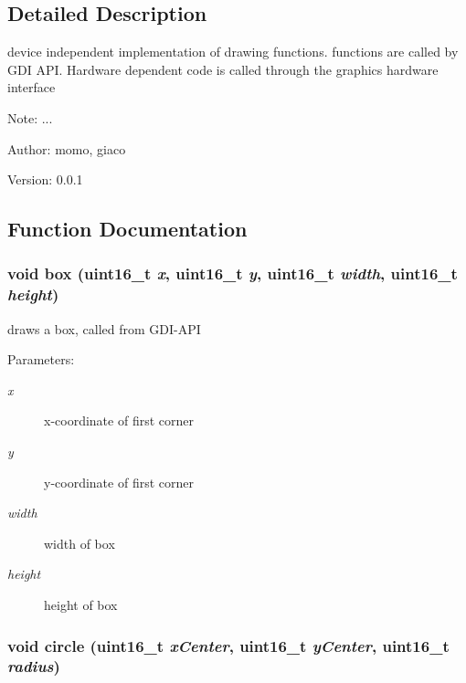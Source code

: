 \subsection{Detailed Description}
device independent implementation of drawing functions. functions are called by GDI API. Hardware dependent code is called through the graphics hardware interface 

\begin{Desc}
\item[Note:]... \end{Desc}
\begin{Desc}
\item[Author:]momo, giaco \end{Desc}
\begin{Desc}
\item[Version:]0.0.1 \end{Desc}


\subsection{Function Documentation}
\hypertarget{group__graphic__device_g8bdd86d104cca372768afe13dd8e66b4}{
\subsubsection[{box}]{\setlength{\rightskip}{0pt plus 5cm}void box (uint16\_\-t {\em x}, \/  uint16\_\-t {\em y}, \/  uint16\_\-t {\em width}, \/  uint16\_\-t {\em height})}}
\label{group__graphic__device_g8bdd86d104cca372768afe13dd8e66b4}


draws a box, called from GDI-API 

\begin{Desc}
\item[Parameters:]
\begin{description}
\item[{\em x}]x-coordinate of first corner \item[{\em y}]y-coordinate of first corner \item[{\em width}]width of box \item[{\em height}]height of box \end{description}
\end{Desc}
\hypertarget{group__graphic__device_gc94c3233de7ff3e87551f5ee9717b1bb}{
\subsubsection[{circle}]{\setlength{\rightskip}{0pt plus 5cm}void circle (uint16\_\-t {\em xCenter}, \/  uint16\_\-t {\em yCenter}, \/  uint16\_\-t {\em radius})}}
\label{group__graphic__device_gc94c3233de7ff3e87551f5ee9717b1bb}


